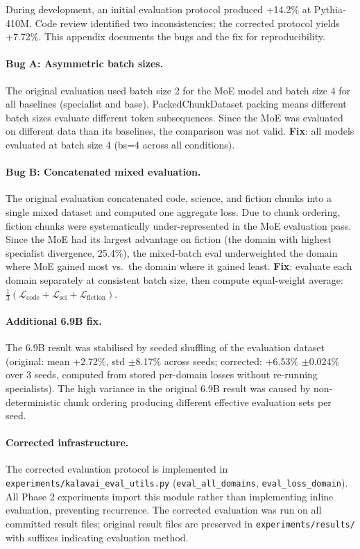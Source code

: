 \documentclass{article}
\begin{document}
During development, an initial evaluation protocol produced +14.2\% at Pythia-410M. Code review identified two inconsistencies; the corrected protocol yields +7.72\%. This appendix documents the bugs and the fix for reproducibility.

\paragraph{Bug A: Asymmetric batch sizes.} The original evaluation used batch size 2 for the MoE model and batch size 4 for all baselines (specialist and base). PackedChunkDataset packing means different batch sizes evaluate different token subsequences. Since the MoE was evaluated on different data than its baselines, the comparison was not valid. \textbf{Fix}: all models evaluated at batch size 4 (bs=4 across all conditions).

\paragraph{Bug B: Concatenated mixed evaluation.} The original evaluation concatenated code, science, and fiction chunks into a single mixed dataset and computed one aggregate loss. Due to chunk ordering, fiction chunks were systematically under-represented in the MoE evaluation pass. Since the MoE had its largest advantage on fiction (the domain with highest specialist divergence, 25.4\%), the mixed-batch eval underweighted the domain where MoE gained most vs.\ the domain where it gained least. \textbf{Fix}: evaluate each domain separately at consistent batch size, then compute equal-weight average: $\frac{1}{3}(\mathcal{L}_\text{code} + \mathcal{L}_\text{sci} + \mathcal{L}_\text{fiction})$.

\paragraph{Additional 6.9B fix.} The 6.9B result was stabilised by seeded shuffling of the evaluation dataset (original: mean +2.72\%, std $\pm$8.17\% across seeds; corrected: +6.53\% $\pm$0.024\% over 3 seeds, computed from stored per-domain losses without re-running specialists). The high variance in the original 6.9B result was caused by non-deterministic chunk ordering producing different effective evaluation sets per seed.

\paragraph{Corrected infrastructure.} The corrected evaluation protocol is implemented in \texttt{experiments/kalavai\_eval\_utils.py} (\texttt{eval\_all\_domains}, \texttt{eval\_loss\_domain}). All Phase 2 experiments import this module rather than implementing inline evaluation, preventing recurrence. The corrected evaluation was run on all committed result files; original result files are preserved in \texttt{experiments/results/} with suffixes indicating evaluation method.
\end{document}
